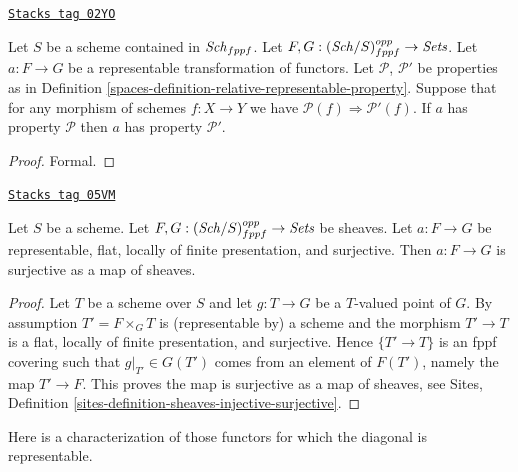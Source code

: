 \begin{lemma}
\label{spaces-lemma-representable-transformations-property-implication}
\href{https://stacks.math.columbia.edu/tag/02YO}{\texttt{Stacks tag 02YO}}

Let $S$ be a scheme contained in $\mathit{Sch}_{fppf}$.
Let $F, G : (\mathit{Sch}/S)_{fppf}^{opp} \to \textit{Sets}$.
Let $a : F \to G$ be a representable transformation of functors.
Let $\mathcal{P}$, $\mathcal{P}'$ be properties as in
Definition \ref{spaces-definition-relative-representable-property}.
Suppose that for any morphism of schemes $f : X \to Y$
we have $\mathcal{P}(f) \Rightarrow \mathcal{P}'(f)$.
If $a$ has property $\mathcal{P}$ then
$a$ has property $\mathcal{P}'$.
\end{lemma}

\begin{proof}
Formal.
\end{proof}

\begin{lemma}
\label{spaces-lemma-surjective-flat-locally-finite-presentation}
\href{https://stacks.math.columbia.edu/tag/05VM}{\texttt{Stacks tag 05VM}}

Let $S$ be a scheme.
Let $F, G : (\mathit{Sch}/S)_{fppf}^{opp} \to \textit{Sets}$ be sheaves.
Let $a : F \to G$ be representable, flat,
locally of finite presentation, and surjective.
Then $a : F \to G$ is surjective as a map of sheaves.
\end{lemma}

\begin{proof}
Let $T$ be a scheme over $S$ and let $g : T \to G$ be a $T$-valued point of
$G$. By assumption $T' = F \times_G T$ is (representable by) a scheme and
the morphism $T' \to T$ is a flat, locally of finite presentation, and
surjective. Hence $\{T' \to T\}$ is an fppf covering such
that $g|_{T'} \in G(T')$ comes from an element of $F(T')$, namely
the map $T' \to F$. This proves the map is surjective as
a map of sheaves, see
Sites, Definition \ref{sites-definition-sheaves-injective-surjective}.
\end{proof}

Here is a characterization of those functors for which the
diagonal is representable.

